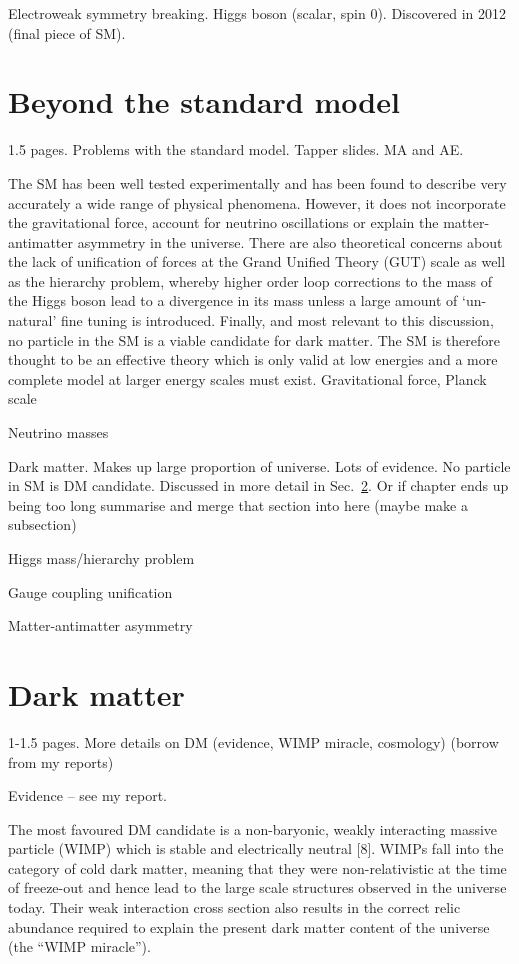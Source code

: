 Electroweak symmetry breaking. Higgs boson (scalar, spin 0). Discovered in 2012 
(final piece of SM).

\section{Beyond the standard model}
\label{sec:theory-bsm}
1.5 pages. Problems with the standard model. Tapper slides. 
MA and AE.

The SM has been well tested experimentally and has been found to describe very 
accurately a wide range of physical phenomena. However, it does not incorporate 
the gravitational force, account for neutrino oscillations or explain the 
matter-antimatter asymmetry in the universe. There are also theoretical 
concerns about the lack of unification of forces at the Grand Unified Theory
(GUT) scale as well as the hierarchy problem, whereby higher order loop 
corrections to the mass of the Higgs boson lead to a divergence in its mass 
unless a large amount of `un-natural' fine tuning is introduced. Finally, and 
most relevant to this discussion, no particle in the SM is a viable candidate 
for dark matter. The SM is therefore thought to be an effective theory which is 
only valid at low energies and a more complete model at larger energy scales 
must exist.
Gravitational force, Planck scale

Neutrino masses

Dark matter. Makes up large proportion of universe. Lots of evidence. No 
particle in SM is DM candidate. Discussed in more detail in 
Sec.~\ref{sec:theory-dm}. Or if chapter ends up being too long summarise and 
merge that section into here (maybe make a subsection)

Higgs mass/hierarchy problem

Gauge coupling unification

Matter-antimatter asymmetry

\section{Dark matter}
\label{sec:theory-dm}
1-1.5 pages. More details on DM (evidence, WIMP miracle, cosmology) (borrow 
from my reports)

Evidence -- see my report.

The most favoured DM candidate is a non-baryonic, weakly interacting massive 
particle (WIMP) which is stable and electrically neutral [8]. WIMPs fall into 
the category of cold dark matter, meaning that they were non-relativistic at 
the time of freeze-out and hence lead to the large scale structures observed in 
the universe today. Their weak interaction cross section also results in the 
correct relic abundance required to explain the present dark matter content of 
the universe (the ``WIMP miracle'').

